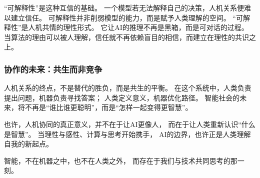 “可解释性”是这种互信的基础。  
一个模型若无法解释自己的决策，人机关系便难以建立信任。  
可解释性并非削弱模型的能力，而是赋予人类理解的空间。  
“可解释性”是人机共情的理性形式。  
它让AI的推理不再是黑箱，而是可对话的过程。  
当算法的理由可以被人理解，信任就不再依赖盲目的相信，而建立在理性的共识之上。

\subsubsection{协作的未来：共生而非竞争}

人机关系的终点，不是替代的胜负，而是共生的平衡。  
在这个系统中，人类负责提出问题，机器负责寻找答案；  
人类定义意义，机器优化路径。  
智能社会的未来，将不再是“谁比谁更聪明”，而是“怎样一起变得更智慧”。

也许，人机协同的真正意义，并不在于让AI更像人，  
而在于让人类重新认识“什么是智慧”。  
当理性与感性、计算与思考开始携手，  
AI的边界，也许正是人类理解自我的新起点。

\begin{center}
智能，不在机器之中，也不在人类之外，  
而存在于我们与技术共同思考的那一刻。  
\end{center}